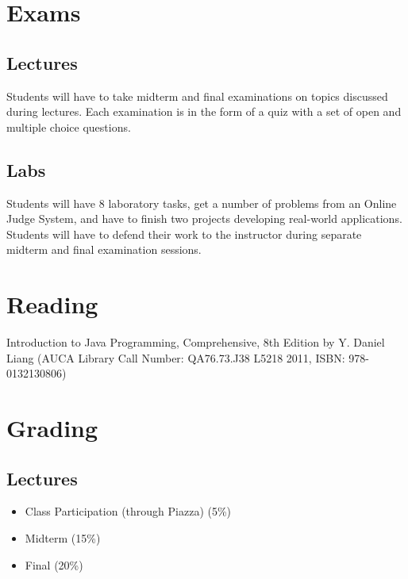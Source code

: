 \documentclass[12pt,a4paper,oneside]{article}
\begin{document}
    \section{Exams}

        \subsection{Lectures}

            Students will have to take midterm and final examinations on topics
            discussed during lectures. Each examination is in the form of a quiz
            with a set of open and multiple choice questions.

        \subsection{Labs}

            Students will have 8 laboratory tasks, get a number of problems from
            an Online Judge System, and have to finish two projects developing
            real-world applications. Students will have to defend their work to
            the instructor during separate midterm and final examination
            sessions.

    \section{Reading}

        Introduction to Java Programming, Comprehensive, 8th Edition by Y.
        Daniel Liang (AUCA Library Call Number: QA76.73.J38 L5218 2011, ISBN:
        978-0132130806)

    \section{Grading}

        \subsection{Lectures}

            \begin{itemize}
                \item Class Participation (through Piazza) (5\%)
                \item Midterm (15\%)
                \item Final (20\%)
            \end{itemize}
\end{document}
